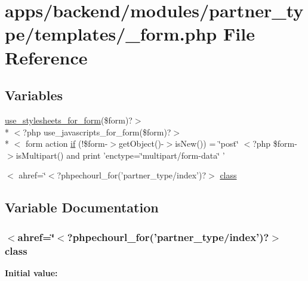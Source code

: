 \hypertarget{backend_2modules_2partner__type_2templates_2__form_8php}{\section{apps/backend/modules/partner\-\_\-type/templates/\-\_\-form.php File Reference}
\label{backend_2modules_2partner__type_2templates_2__form_8php}
}
\subsection*{Variables}
\begin{DoxyCompactItemize}
\item 
\hyperlink{live_2modules_2user_2templates_2__form_8php_a86bc4522fdbe625b07bc4a4d6eec3df7}{use\-\_\-stylesheets\-\_\-for\-\_\-form}(\$form)?$>$\\*
$<$?php use\-\_\-javascripts\-\_\-for\-\_\-form(\$form)?$>$\\*
$<$ form action \hyperlink{backend_2modules_2partner__type_2templates_2__form_8php_ae30a307b320d8da5d9a945eaf68f7549}{if} (!\$form-\/$>$get\-Object()-\/$>$is\-New()) = \char`\"{}post\char`\"{} $<$?php \$form-\/$>$is\-Multipart() and print 'enctype=\char`\"{}multipart/form-\/data\char`\"{} '
\item 
$<$ ahref=\char`\"{}$<$?phpechourl\-\_\-for('partner\-\_\-type/index')?$>$ \hyperlink{backend_2modules_2partner__type_2templates_2__form_8php_a3264ee3db8603b96d5fc0defb7078206}{class}
\end{DoxyCompactItemize}


\subsection{Variable Documentation}
\hypertarget{backend_2modules_2partner__type_2templates_2__form_8php_a3264ee3db8603b96d5fc0defb7078206}{
\subsubsection[{class}]{\setlength{\rightskip}{0pt plus 5cm}$<$ahref=\char`\"{}$<$?phpechourl\-\_\-for('partner\-\_\-type/index')?$>$ class}}\label{backend_2modules_2partner__type_2templates_2__form_8php_a3264ee3db8603b96d5fc0defb7078206}
{\bfseries Initial value\-:}


